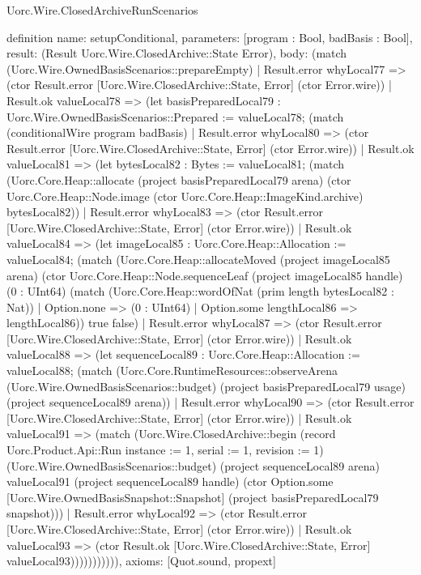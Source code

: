 \begin{lexlean}{Uorc.Wire.ClosedArchiveRunScenarios}
\begin{semanticmodule}
definition{
  name: setupConditional,
  parameters: [program : Bool, badBasis : Bool],
  result: (Result Uorc.Wire.ClosedArchive::State Error),
  body: (match (Uorc.Wire.OwnedBasisScenarios::prepareEmpty)
    | Result.error whyLocal77 => (ctor Result.error [Uorc.Wire.ClosedArchive::State, Error] (ctor Error.wire))
    | Result.ok valueLocal78 => (let basisPreparedLocal79 : Uorc.Wire.OwnedBasisScenarios::Prepared := valueLocal78; (match (conditionalWire program badBasis)
      | Result.error whyLocal80 => (ctor Result.error [Uorc.Wire.ClosedArchive::State, Error] (ctor Error.wire))
      | Result.ok valueLocal81 => (let bytesLocal82 : Bytes := valueLocal81; (match (Uorc.Core.Heap::allocate (project basisPreparedLocal79 arena) (ctor Uorc.Core.Heap::Node.image (ctor Uorc.Core.Heap::ImageKind.archive) bytesLocal82))
        | Result.error whyLocal83 => (ctor Result.error [Uorc.Wire.ClosedArchive::State, Error] (ctor Error.wire))
        | Result.ok valueLocal84 => (let imageLocal85 : Uorc.Core.Heap::Allocation := valueLocal84; (match (Uorc.Core.Heap::allocateMoved (project imageLocal85 arena) (ctor Uorc.Core.Heap::Node.sequenceLeaf (project imageLocal85 handle) (0 : UInt64) (match (Uorc.Core.Heap::wordOfNat (prim length bytesLocal82 : Nat))
            | Option.none => (0 : UInt64)
            | Option.some lengthLocal86 => lengthLocal86)) true false)
          | Result.error whyLocal87 => (ctor Result.error [Uorc.Wire.ClosedArchive::State, Error] (ctor Error.wire))
          | Result.ok valueLocal88 => (let sequenceLocal89 : Uorc.Core.Heap::Allocation := valueLocal88; (match (Uorc.Core.RuntimeResources::observeArena (Uorc.Wire.OwnedBasisScenarios::budget) (project basisPreparedLocal79 usage) (project sequenceLocal89 arena))
            | Result.error whyLocal90 => (ctor Result.error [Uorc.Wire.ClosedArchive::State, Error] (ctor Error.wire))
            | Result.ok valueLocal91 => (match (Uorc.Wire.ClosedArchive::begin (record Uorc.Product.Api::Run {instance := 1, serial := 1, revision := 1}) (Uorc.Wire.OwnedBasisScenarios::budget) (project sequenceLocal89 arena) valueLocal91 (project sequenceLocal89 handle) (ctor Option.some [Uorc.Wire.OwnedBasisSnapshot::Snapshot] (project basisPreparedLocal79 snapshot)))
              | Result.error whyLocal92 => (ctor Result.error [Uorc.Wire.ClosedArchive::State, Error] (ctor Error.wire))
              | Result.ok valueLocal93 => (ctor Result.ok [Uorc.Wire.ClosedArchive::State, Error] valueLocal93))))))))))),
  axioms: [Quot.sound, propext]
}


\end{semanticmodule}
\end{lexlean}
